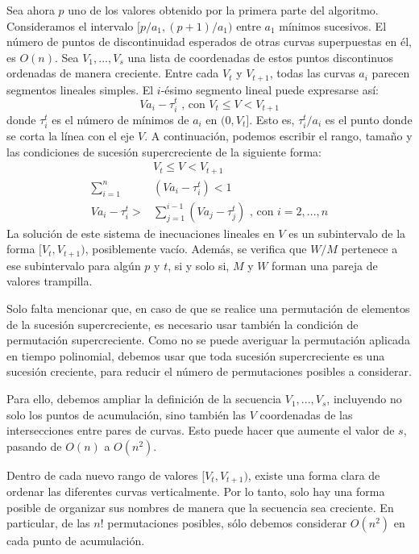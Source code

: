     Sea ahora $p$ uno de los valores obtenido por la primera parte del algoritmo. Consideramos el intervalo $[p/a_{1}, (p+1)/a_{1})$ entre $a_{1}$ mínimos sucesivos. El número de puntos de discontinuidad esperados de otras curvas superpuestas en él, es $O(n)$. Sea $V_{1}, ... , V_{s}$ una lista de coordenadas de estos puntos discontinuos ordenadas de manera creciente. Entre cada $V_{t}$ y $V_{t+1}$, todas las curvas $a_{i}$ parecen segmentos lineales simples. El $i$-ésimo segmento lineal puede expresarse así:
    \begin{equation}
        Va_{i} - \tau^{t}_{i} \text{ , con } V_{t} \leq V < V_{t+1}
    \end{equation}
    donde $\tau^{t}_{i}$ es el número de mínimos de $a_{i}$ en $(0, V_{t}]$. Esto es, $\tau^{t}_{i}/a_{i}$ es el punto donde se corta la línea con el eje $V$. A continuación, podemos escribir el rango, tamaño y las condiciones de sucesión supercreciente de la siguiente forma:
    \begin{align}
        &V_{t} \leq V < V_{t+1} \\
        \sum_{i=1}^{n} &(Va_{i} - \tau^{t}_{i}) < 1 \\
        Va_{i} - \tau^{t}_{i} > &\sum_{j=1}^{i-1} (Va_{j} - \tau^{t}_{j}) \text{ , con } i = 2, ... , n
    \end{align}
    La solución de este sistema de inecuaciones lineales en $V$ es un subintervalo de la forma $[V_{t}, V_{t+1})$, posiblemente vacío. Además, se verifica que $W/M$ pertenece a ese subintervalo para algún $p$ y $t$, si y solo si, $M$ y $W$ forman una pareja de valores trampilla.

    Solo falta mencionar que, en caso de que se realice una permutación de elementos de la sucesión supercreciente, es necesario usar también la condición de permutación supercreciente. Como no se puede averiguar la permutación aplicada en tiempo polinomial, debemos usar que toda sucesión supercreciente es una sucesión creciente, para reducir el número de permutaciones posibles a considerar. 

    Para ello, debemos ampliar la definición de la secuencia $V_{1}, ... , V_{s}$, incluyendo no solo los puntos de acumulación, sino también las $V$ coordenadas de las intersecciones entre pares de curvas. Esto puede hacer que aumente el valor de $s$, pasando de $O(n)$ a $O(n^2)$. 
    
    Dentro de cada nuevo rango de valores $[V_{t}, V_{t+1})$, existe una forma clara de ordenar las diferentes curvas verticalmente. Por lo tanto, solo hay una forma posible de organizar sus nombres de manera que la secuencia sea creciente. En particular, de las $n!$ permutaciones posibles, sólo debemos considerar $O(n^2)$ en cada punto de acumulación.
    
